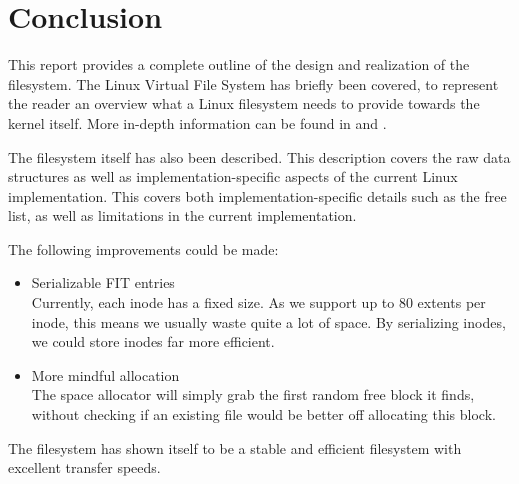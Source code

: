 \chapter{Conclusion}

This report provides a complete outline of the design and realization of the filesystem. The Linux Virtual File System has briefly been covered, to represent the reader an overview what a Linux filesystem needs to provide towards the kernel itself. More in-depth information can be found in \cite{UtLK} and \cite{LKD}.

The filesystem itself has also been described. This description covers the raw data structures as well as implementation-specific aspects of the current Linux implementation. This covers both implementation-specific details such as the free list, as well as limitations in the current implementation.

The following improvements could be made:

\begin{itemize}
\item Serializable FIT entries \\
Currently, each inode has a fixed size. As we support up to 80 extents per inode, this means we usually waste quite a lot of space. By serializing inodes, we could store inodes far more efficient.
\item More mindful allocation \\
The space allocator will simply grab the first random free block it finds, without checking if an existing file would be better off allocating this block.
\end{itemize}

The filesystem has shown itself to be a stable and efficient filesystem with excellent transfer speeds.
